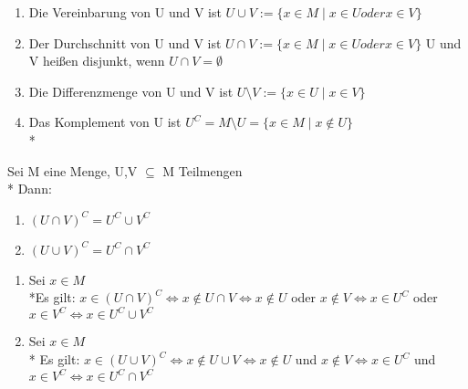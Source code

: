 \begin{enumerate}
\item Die Vereinbarung von U und V ist $U \cup V := \{x \in M \mid x \in U oder x \in V\}$
\item Der Durchschnitt von U und V ist $U \cap V := \{x \in M \mid x \in U oder x \in V\}$
U und V heißen disjunkt, wenn $U \cap V = \emptyset$
\item Die Differenzmenge von U und V ist $U \setminus V := \{x \in U \mid x \in V\}$
\item Das Komplement von U ist $U^C = M \setminus U = \{x \in M \mid x {\not\in} U\}$\\*
%
\end{enumerate}
%
Sei M eine Menge, U,V $\subseteq$ M Teilmengen\\*
Dann:
\begin{enumerate}
\item $(U \cap V)^C = U^C \cup V^C$
\item $(U \cup V)^C = U^C \cap V^C$
\end{enumerate}
%
\bew
\begin{enumerate}
\item{Sei $x \in M$\\*Es gilt: $x \in (U \cap V)^C \Leftrightarrow x {\not\in} U \cap V \Leftrightarrow x {\not\in} U$ oder $x {\not\in} V\Leftrightarrow x \in U^C$ oder $x \in V^C \Leftrightarrow x\in U^C \cup V^C$}
\item{ Sei $x \in M$\\* Es gilt: $x \in (U \cup V)^C \Leftrightarrow x {\not\in} U \cup V \Leftrightarrow x {\not\in} U$ und $x {\not\in} V\Leftrightarrow x \in U^C$ und $x \in V^C \Leftrightarrow x\in U^C \cap V^C$}
\end{enumerate}
%
